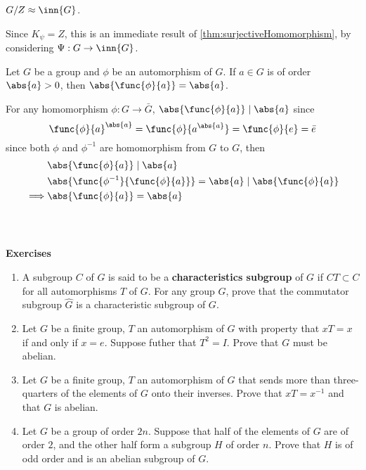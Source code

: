 \begin{lemma}
    \( G/Z\approx \inn{G}\).
\end{lemma}

\begin{prooflemma}
    Since \(K_{\psi} = Z\), this is an immediate result of \ref{thm:surjectiveHomomorphism}, by considering \(\Psi:G \to \inn{G}\).
\end{prooflemma}

\begin{lemma}
    Let \(G\) be a group and \(\phi\) be an automorphism of \(G\). If \(a \in G\) is of order \(\abs{a} > 0\), then \(\abs{\func{\phi}{a}} = \abs{a}\).
\end{lemma}

\begin{prooflemma}
    For any homomorphism \(\phi:G \to \bar{G}\), \(\abs{\func{\phi}{a}} \mid \abs{a}\) since 
    \begin{equation*}
        \func{\phi}{a}^{\abs{a}}= \func{\phi}{a^{\abs{a}}} = \func{\phi}{e} = \bar{e}
    \end{equation*}
    since both \(\phi\) and \(\phi^{-1}\) are homomorphism from \(G\) to \(G\), then 
    \begin{align*}
        &\abs{\func{\phi}{a}} \mid \abs{a}\\
        &\abs{\func{\phi^{-1}}{\func{\phi}{a}}} = \abs{a} \mid \abs{\func{\phi}{a}}\\
        \implies & \abs{\func{\phi}{a}} = \abs{a}
    \end{align*}
    \
\end{prooflemma}
\ \\ 
{\Large{\textbf{Exercises}}}
\begin{enumerate}
    \item A subgroup \(C\) of \(G\) is said to be a \textbf{characteristics subgroup} of \(G\) if \(CT \subset C\) for all automorphisms \(T\) of \(G\).    For any group \(G\), prove that the commutator subgroup \(\hat{G}\) is a characteristic subgroup of \(G\).
    \item Let \(G\) be a finite group, \(T\) an automorphism of \(G\) with property that \(xT=x\) if and only if \(x = e\). Suppose futher that \(T^2 = I\). Prove that \(G\) must be abelian.
    \item Let \(G\) be a finite group, \(T\) an automorphism of \(G\) that sends more than three-quarters of the elements of \(G\) onto their inverses. Prove that  \(xT = x^{-1}\) and that \(G\) is abelian.
    \item Let \(G\) be a group of order \(2n\). Suppose that half of the elements of \(G\) are of order \(2\), and the other half form a subgroup \(H\) of order \(n\). Prove that \(H\) is of odd order and is an abelian subgroup of \(G\).
\end{enumerate}
